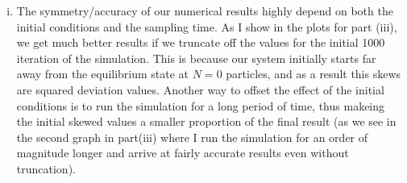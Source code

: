 \documentclass{article}
\begin{document}
\begin{enumerate}[i.]
  \item The symmetry/accuracy of our numerical results highly depend on both the initial conditions and the sampling time. As I show in the plots for part (iii), we get much better results if we truncate off the values for the initial 1000 iteration of the simulation. This is because our system initially starts far away from the equilibrium state at $N=0$ particles, and as a result this skews are squared deviation values. Another way to offset the effect of the initial conditions is to run the simulation for a long period of time, thus makeing the initial skewed values a smaller proportion of the final result (as we see in the second graph in part(iii) where I run the simulation for an order of magnitude longer and arrive at fairly accurate results even without truncation).
\end{enumerate}
\end{document}
